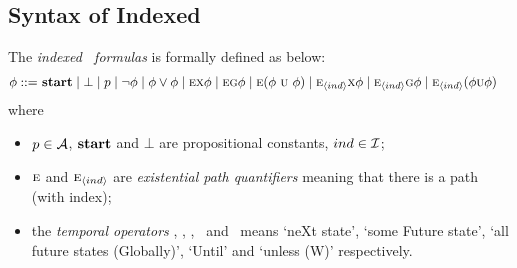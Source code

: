 \documentclass[twoside,11pt]{article}
\begin{document}



\subsection{Syntax of Indexed \CTL}

The {\em indexed \CTL\ formulas} is formally defined as below:
\begin{align*}
    \phi  ::= & \ \start\mid \bot %
    \mid p \mid\neg\phi \mid \phi\lor\phi \mid
	\EXIST \NEXT \phi \mid
	\EXIST \GLOBAL \phi \mid
	\EXIST (\phi\ \UNTIL\ \phi)\mid
	  \EXIST_{\tuple{ind}}\NEXT \phi  \mid
	\EXIST_{\tuple{ind}}\GLOBAL \phi \mid
	\EXIST_{\tuple{ind}}(\phi \UNTIL \phi) %
\end{align*}
where
\begin{itemize}
    \item $p\in\cal A$, $\textbf{start}$ and $\bot$ are propositional constants,
     $ind\in {\cal I}$;
    \item $\textsc{e}$ and $\textsc{e}_{{\langle{ind}\rangle}}$ are {\em existential path quantifiers} meaning that there is a path (with index);
    \item the {\em temporal operators} \NEXT, \FUTURE, \GLOBAL, \UNTIL\ and \UNLESS\
	means `neXt state', `some Future state', `all future states (Globally)', `Until' and `unless (W)' respectively.
\end{itemize}
\end{document}
